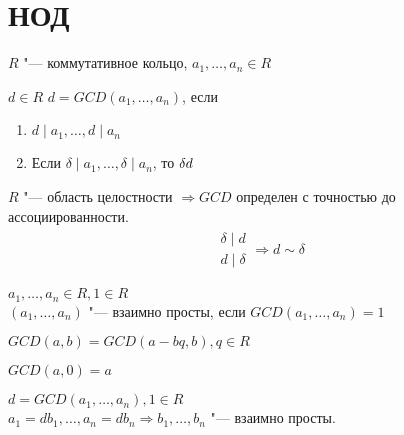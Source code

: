 \section{НОД}

$R$ "--- коммутативное кольцо, $a_{1}, \dots, a_{n} \in R$
\begin{Def}
	$d \in R$ $d = GCD\left(a_{1}, \dots, a_{n}\right)$, если 
	\begin{enumerate}
		\item $d \mid a_{1}, \dots, d \mid a_{n}$
		\item Если $\delta \mid a_{1}, \dots, \delta \mid a_{n}$, то $\delta \mit d$
	\end{enumerate}
\end{Def}

\begin{Rem}
	$R$ "--- область целостности $\Rightarrow GCD$ определен с точностью до ассоциированности. 
	\begin{gather*}
		\begin{array}{c}
			\delta \mid d \\
			d \mid \delta
		\end{array}
		\Rightarrow d \sim \delta
	\end{gather*}
\end{Rem}

\begin{Def}
	$a_{1}, \dots, a_{n} \in R, 1 \in R$ \\
	$\left(a_{1}, \dots, a_{n}\right)$ "--- взаимно просты, если $GCD\left(a_{1}, \dots, a_{n}\right) = 1$
\end{Def}

\begin{conseq}
	$GCD\left(a, b\right) = GCD\left(a - bq, b\right), q \in R$
\end{conseq}
\begin{conseq}
	$GCD\left(a, 0\right) = a$
\end{conseq}
\begin{conseq}
	$d = GCD\left(a_{1}, \dots, a_{n}\right), 1 \in R $ \\
	$a_{1} = db_{1}, \dots, a_{n} = db_{n} \Rightarrow b_{1}, \dots, b_{n}$ "--- взаимно просты.
\end{conseq}

